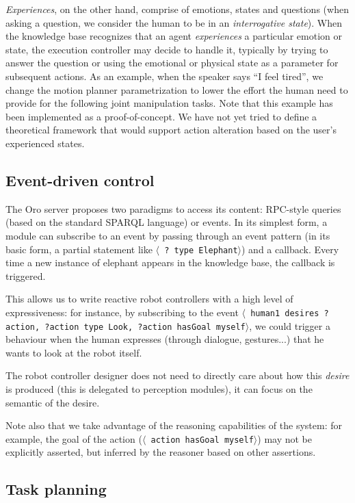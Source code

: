 \documentclass[letterpaper, 10 pt, conference]{ieeeconf}  %
\newcommand{\stmt}[1]{{\footnotesize \tt $\langle$ #1\relax$\rangle$}}
\begin{document}
\emph{Experiences}, on the other hand, comprise of emotions, states and
questions (when asking a question, we consider the human to be in an
\emph{interrogative state}). When the knowledge base recognizes that an agent
\emph{experiences} a particular emotion or state, the execution controller may
decide to handle it, typically by trying to answer the question or using the
emotional or physical state as a parameter for subsequent actions. As an example,
when the speaker says ``I feel tired'', we change the motion planner
parametrization to lower the effort the human need to provide for the following
joint manipulation tasks. Note that this example has been implemented as a
proof-of-concept. We have not yet tried to define a theoretical framework that
would support action alteration based on the user's experienced states.

\subsection{Event-driven control}

The {\sc Oro} server proposes two paradigms to access its content: RPC-style
queries (based on the standard SPARQL language) or events. In its simplest
form, a module can subscribe to an event by passing through an event pattern
(in its basic form, a partial statement like \stmt{? type Elephant}) and a
callback.  Every time a new instance of elephant appears in the knowledge base,
the callback is triggered.

This allows us to write reactive robot controllers with a high level of
expressiveness: for instance, by subscribing to the event \stmt{human1 desires
?action, ?action type Look, ?action hasGoal myself}, we could trigger a
behaviour when the human expresses (through dialogue, gestures...) that he
wants to look at the robot itself.

The robot controller designer does not need to directly care about how this
\emph{desire} is produced (this is delegated to perception modules), it can
focus on the semantic of the desire.

Note also that we take advantage of the reasoning capabilities of the system:
for example, the goal of the action (\stmt{action hasGoal myself}) may not be
explicitly asserted, but inferred by the reasoner based on other assertions.

\subsection{Task planning}
\end{document}
